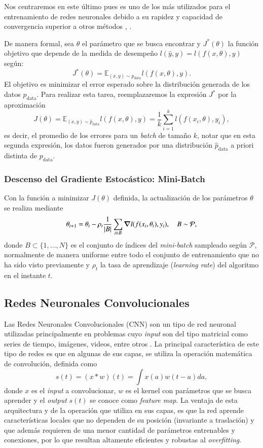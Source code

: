 Nos centraremos en este último pues es uno de los más utilizados para el entrenamiento de redes neuronales debido a su rapidez y capacidad de convergencia superior a otros métodos \cite{WILSON20031429}, \cite{article}.

\vspace{0.2cm}

De manera formal, sea $\theta$ el parámetro que se busca encontrar y $J^{*}(\theta)$ la función objetivo que depende de la medida de desempeño $l(\hat{y},y) = l(f(x , \theta),y) $ según: 
\[
J^{*}(\theta) = \mathbb{E}_{(x,y) \sim p_{\text{data}}} l(f(x , \theta),y) .
\]
El objetivo es minimizar el error esperado sobre la distribución generada de los datos $p_{\text{data}}$. Para realizar esta tarea, reemplazaremos la expresión $J^{*}$ por la aproximación 
\[
J(\theta) = \mathbb{E}_{(x,y) \sim \hat{p}_{\text{data}}} l(f(x , \theta),y) = \frac{1}{k}\sum_{i=1}^{k}l(f(x_i , \theta),y_i) , 
\]
es decir, el promedio de los errores para un \textit{batch} de tamaño $k$, notar que en esta segunda expresión, los datos fueron generados por una distribución $\hat{p}_{\text{data}}$ a priori distinta de $p_{\text{data}}$. 

\subsubsection{Descenso del Gradiente Estocástico: Mini-Batch}

Con la función a minimizar $J(\theta)$ definida, la actualización de los parámetros $\theta$ se realiza mediante 
\[
\theta_{t+1} = \theta_t - \rho_t \frac{1}{|B|}\sum_{i \in B}\grad l(f(x_i , \theta_t),y_i) , \quad B \sim \mathcal{P} ,  
\]
donde $B \subset \{1 , \dots , N\}$ es el conjunto de índices del \textit{mini-batch} sampleado según $\mathcal{P}$, normalmente de manera uniforme entre todo el conjunto de entrenamiento que no ha sido visto previamente y $\rho_t$ la tasa de aprendizaje (\textit{learning rate}) del algoritmo en el instante $t$. 


\subsection{Redes Neuronales Convolucionales}

Las Redes Neuronales Convolucionales (CNN) son un tipo de red neuronal utilizadas principalmente en problemas cuyo \textit{input} son del tipo matricial como series de tiempo, imágenes, videos, entre otros \cite{INDOLIA2018679}. La principal característica de este tipo de redes es que en algunas de sus capas, se utiliza la operación matemática de convolución, definida como 
\[
s(t) = (x * w)(t) = \int x(a)w(t-a)da , 
\]
donde $x$ es el \textit{input} a convolucionar, $w$ es el kernel con parámetros que se busca aprender y el \textit{output} $s(t)$ se conoce como \textit{feature map}. La ventaja de esta arquitectura y de la operación que utiliza en sus capas, es que la red aprende características locales que no dependen de su posición (invariante a traslación) y que además requieren de una menor cantidad de parámetros entrenables y conexiones, por lo que resultan altamente eficientes y robustas al \textit{overfitting}.
 
